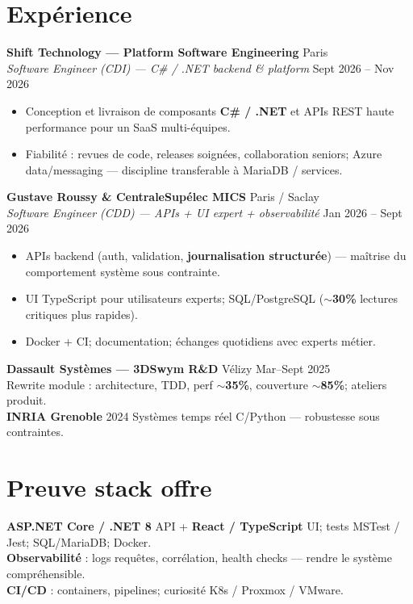 \documentclass[10pt,a4paper]{article}
\begin{document}
\section{Exp\'erience}
\textbf{Shift Technology --- Platform Software Engineering} \hfill Paris\\
\textit{Software Engineer (CDI) --- C\# / .NET backend \& platform} \hfill Sept 2026 -- Nov 2026
\begin{itemize}
  \item Conception et livraison de composants \textbf{C\# / .NET} et APIs REST haute performance pour un SaaS multi-\'equipes.
  \item Fiabilit\'e : revues de code, releases soign\'ees, collaboration seniors; Azure data/messaging --- discipline transferable \`a MariaDB / services.
\end{itemize}

\textbf{Gustave Roussy \& CentraleSup\'elec MICS} \hfill Paris / Saclay\\
\textit{Software Engineer (CDD) --- APIs + UI expert + observabilit\'e} \hfill Jan 2026 -- Sept 2026
\begin{itemize}
  \item APIs backend (auth, validation, \textbf{journalisation structur\'ee}) --- ma\^itrise du comportement syst\`eme sous contrainte.
  \item UI TypeScript pour utilisateurs experts; SQL/PostgreSQL (\textbf{$\sim$30\%} lectures critiques plus rapides).
  \item Docker + CI; documentation; \'echanges quotidiens avec experts m\'etier.
\end{itemize}

\textbf{Dassault Syst\`emes --- 3DSwym R\&D} \hfill V\'elizy \hfill Mar--Sept 2025\\
Rewrite module : architecture, TDD, perf \textbf{$\sim$35\%}, couverture \textbf{$\sim$85\%}; ateliers produit.\\[2pt]
\textbf{INRIA Grenoble} \hfill 2024 \quad Syst\`emes temps r\'eel C/Python --- robustesse sous contraintes.

\section{Preuve stack offre}
\textbf{ASP.NET Core / .NET 8} API + \textbf{React / TypeScript} UI; tests MSTest / Jest; SQL/MariaDB; Docker.\\
\textbf{Observabilit\'e} : logs requ\^etes, corr\'elation, health checks --- rendre le syst\`eme compr\'ehensible.\\
\textbf{CI/CD} : containers, pipelines; curiosit\'e K8s / Proxmox / VMware.
\end{document}
